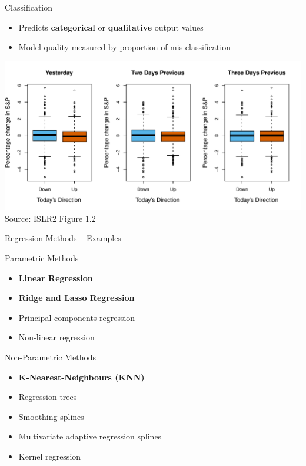 \documentclass[ignorenonframetext,xcolor=x11names]{beamer}
\begin{document}
\begin{frame}{Classification}
  \begin{itemize}
     \item Predicts \textbf{categorical} or \textbf{qualitative} output values
     \item Model quality measured by proportion of mis-classification
  \end{itemize}
\centering
\vspace{5mm}
\includegraphics[width=\textwidth]{Figures_Chapters_1-6/Chapter1/1_2.pdf}
\scriptsize Source: ISLR2 Figure 1.2
\end{frame}

\begin{frame}{Regression Methods -- Examples}
\begin{block}{Parametric Methods}
\begin{itemize}
   \item \textbf{Linear Regression}
   \item \textbf{Ridge and Lasso Regression}
   \item Principal components regression
   \item Non-linear regression
\end{itemize}
\end{block}

\begin{block}{Non-Parametric Methods}
\begin{itemize}
  \item \textbf{K-Nearest-Neighbours (KNN)}
  \item Regression trees
  \item Smoothing splines
  \item Multivariate adaptive regression splines
  \item Kernel regression
\end{itemize}
\end{block}
\end{frame}
\end{document}

